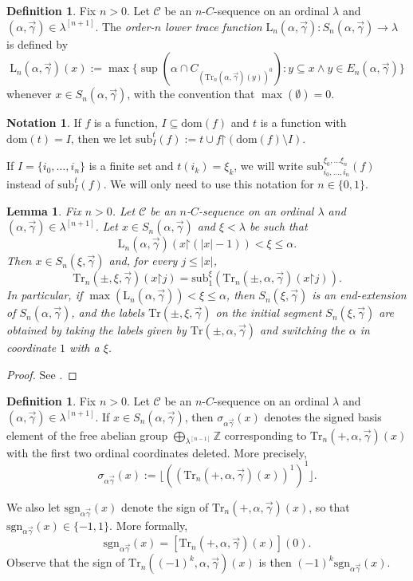 \documentclass{amsart}
\numberwithin{theorem}{section}
\newtheorem{lemma}[theorem]{Lemma}
\theoremstyle{definition}
\newtheorem{definition}[theorem]{Definition}
\newtheorem{notation}[theorem]{Notation}
\newcommand{\restr}{\mathord{\upharpoonright}}
\renewcommand{\subset}{\subseteq}
\renewcommand{\L}{\mathrm{L}}
\newcommand{\dom}{\mathrm{dom}}
\newcommand{\sub}{\mathrm{sub}}
\newcommand{\Z}{\mathbb{Z}}
\newcommand{\C}{\mathcal{C}}
\newcommand{\Tr}{\mathrm{Tr}}
\newcommand{\sgn}{\mathrm{sgn}}
\begin{document}
\begin{definition}\label{lowerTrace}
Fix $n>0$. Let $\C$ be an $n$-$C$-sequence on an ordinal $\lambda$ and $(\alpha,\vec{\gamma}) \in \lambda^{[n+1]}$. The \emph{order-$n$ lower trace function} $\L_n(\alpha,\vec\gamma):S_n(\alpha,\vec\gamma)\to \lambda$ is defined by
\[
\L_n(\alpha,\vec\gamma)(x):=\max\{\sup(\alpha\cap C_{(\Tr_n(\alpha,\vec\gamma)(y))^0}):y\subset x \wedge y\in E_n(\alpha,\vec\gamma)\}
\]
whenever $x\in S_n(\alpha,\vec\gamma)$, with the convention that $\max(\emptyset)=0$.
\end{definition}


\begin{notation}
If $f$ is a function, $I\subset \dom(f)$ and $t$ is a function with $\dom(t)=I$, then we let $\sub_I^t(f):=t\cup f\restr(\dom(f)\setminus I)$.

If $I=\{i_0,\dots,i_n\}$ is a finite set and $t(i_k)=\xi_k$, we will write $\sub_{i_0,\dots,i_n}^{\xi_0,\dots\xi_n}(f)$ instead of $\sub_I^t(f)$. We will only need to use this notation for $n\in \{0,1\}$.
\end{notation}

\begin{lemma}\label{7.7}
Fix $n>0$. Let $\C$ be an $n$-$C$-sequence on an ordinal $\lambda$ and $(\alpha,\vec{\gamma}) \in \lambda^{[n+1]}$. Let $x\in S_n(\alpha,\vec\gamma)$ and $\xi<\lambda$ be such that
\[
\L_n(\alpha,\vec\gamma)(x\restr(|x|-1))<\xi\le \alpha.
\]
Then $x\in S_n(\xi,\vec\gamma)$ and, for every $j\le|x|$,
\[
\Tr_n(\pm,\xi,\vec\gamma)(x\restr j)=\sub_1^\xi(\Tr_n(\pm,\alpha,\vec\gamma)(x\restr j)).
\]
In particular, if $\max(\L_n(\alpha,\vec\gamma))<\xi\le \alpha$, then $S_n(\xi,\vec\gamma)$ is an end-extension of $S_n(\alpha,\vec\gamma)$, and the labels $\Tr(\pm,\xi,\vec\gamma)$ on the initial segment $S_n(\xi,\vec\gamma)$ are obtained by taking the labels given by $\Tr(\pm,\alpha,\vec\gamma)$ and switching the $\alpha$ in coordinate $1$ with a $\xi$.
\end{lemma}

\begin{proof}
See \cite[Lemma 7.7]{bergfalk2024introductionhigherwalks}. 
\end{proof}


\begin{definition}\label{sigma}
Fix $n > 0$. Let $\C$ be an $n$-$C$-sequence on an ordinal $\lambda$ and $(\alpha,\vec{\gamma}) \in \lambda^{[n+1]}$. If $x\in S_n(\alpha,\vec\gamma)$, then $\sigma_{\alpha\vec\gamma}(x)$ denotes the signed basis element of the free abelian group $\bigoplus_{\lambda^{[n-1]}}\Z$ corresponding to $\Tr_n(+,\alpha,\vec\gamma)(x)$ with the first two ordinal coordinates deleted. More precisely,
\[
\sigma_{\alpha\vec\gamma}(x):=\lfloor ((\Tr_n(+,\alpha,\vec\gamma)(x))^1)^1\rfloor.
\]

We also let $\sgn_{\alpha\vec\gamma}(x)$ denote the sign of $\Tr_n(+,\alpha,\vec\gamma)(x)$, so that $\sgn_{\alpha\vec\gamma}(x)\in\{-1,1\}$. More formally,
\[
\sgn_{\alpha\vec\gamma}(x)=[\Tr_n(+,\alpha,\vec\gamma)(x)](0).
\]
Observe that the sign of $\Tr_n((-1)^k,\alpha,\vec\gamma)(x)$ is then $(-1)^k\sgn_{\alpha\vec\gamma}(x)$.
\end{definition}
\end{document}
